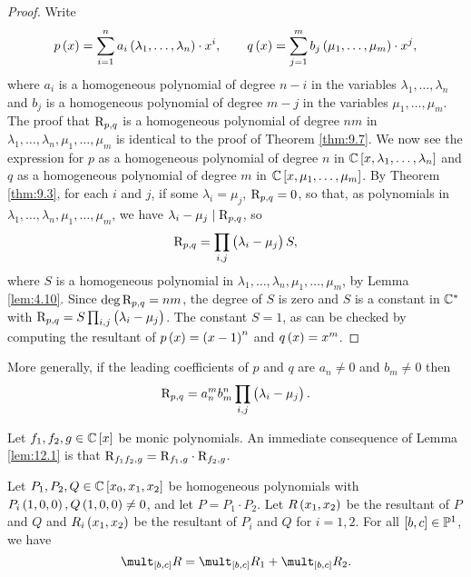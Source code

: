 \begin{proof}
Write
$$ p\br{x} = \sum_{i = 1}^n a_i\br{\lambda_1, \dots, \lambda_n} \cdot x^i, \qquad q\br{x} = \sum_{j = 1}^m b_j\br{\mu_1, \dots, \mu_m} \cdot x^j, $$
where $ a_i $ is a homogeneous polynomial of degree $ n - i $ in the variables $ \lambda_1, \dots, \lambda_n $ and $ b_j $ is a homogeneous polynomial of degree $ m - j $ in the variables $ \mu_1, \dots, \mu_m $. The proof that $ \mathrm{R}_{p, q} $ is a homogeneous polynomial of degree $ nm $ in $ \lambda_1, \dots, \lambda_n, \mu_1, \dots, \mu_m $ is identical to the proof of Theorem \ref{thm:9.7}. We now see the expression for $ p $ as a homogeneous polynomial of degree $ n $ in $ \CC\sbr{x, \lambda_1, \dots, \lambda_n} $ and $ q $ as a homogeneous polynomial of degree $ m $ in $ \CC\sbr{x, \mu_1, \dots, \mu_m} $. By Theorem \ref{thm:9.3}, for each $ i $ and $ j $, if some $ \lambda_i = \mu_j $, $ \mathrm{R}_{p, q} = 0 $, so that, as polynomials in $ \lambda_1, \dots, \lambda_n, \mu_1, \dots, \mu_m $, we have $ \lambda_i - \mu_j \mid \mathrm{R}_{p, q} $, so
$$ \R_{p, q} = \prod_{i, j} \br{\lambda_i - \mu_j}S, $$
where $ S $ is a homogeneous polynomial in $ \lambda_1, \dots, \lambda_n, \mu_1, \dots, \mu_m $, by Lemma \ref{lem:4.10}. Since $ \deg \mathrm{R}_{p, q} = nm $, the degree of $ S $ is zero and $ S $ is a constant in $ \mathbb{C}^* $ with $ \R_{p, q} = S\prod_{i, j} \br{\lambda_i - \mu_j} $. The constant $ S = 1 $, as can be checked by computing the resultant of $ p\br{x} = \br{x - 1}^n $ and $ q\br{x} = x^m $.
\end{proof}

\begin{remark}
More generally, if the leading coefficients of $ p $ and $ q $ are $ a_n \ne 0 $ and $ b_m \ne 0 $ then
$$ \R_{p, q} = a_n^mb_m^n\prod_{i, j} \br{\lambda_i - \mu_j}. $$
\end{remark}

\begin{remark}
\label{rem:12.3}
Let $ f_1, f_2, g \in \CC\sbr{x} $ be monic polynomials. An immediate consequence of Lemma \ref{lem:12.1} is that $ \mathrm{R}_{f_1f_2, g} = \mathrm{R}_{f_1, g} \cdot \mathrm{R}_{f_2, g} $.
\end{remark}

\begin{lemma}
\label{lem:12.4}
Let $ P_1, P_2, Q \in \CC\sbr{x_0, x_1, x_2} $ be homogeneous polynomials with $ P_i\br{1, 0, 0}, Q\br{1, 0, 0} \ne 0 $, and let $ P = P_1 \cdot P_2 $. Let $ R\br{x_1, x_2} $ be the resultant of $ P $ and $ Q $ and $ R_i\br{x_1, x_2} $ be the resultant of $ P_i $ and $ Q $ for $ i = 1, 2 $. For all $ \sbr{b, c} \in \PP^1 $, we have
$$ \mult_{\sbr{b, c}} R = \mult_{\sbr{b, c}} R_1 + \mult_{\sbr{b, c}} R_2. $$
\end{lemma}


